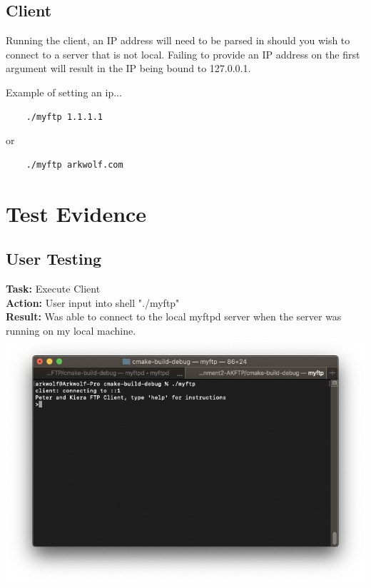 \documentclass{article}
\begin{document}
\subsection{Client}
Running the client, an IP address will need to be parsed in should you wish to connect to a server that is not local. Failing to provide an IP address on the first argument will result in the IP being bound to 127.0.0.1. 

Example of setting an ip...
\begin{lstlisting}
    ./myftp 1.1.1.1
\end{lstlisting}
or
\begin{lstlisting}
    ./myftp arkwolf.com
\end{lstlisting}


\section{Test Evidence}
\subsection{User Testing}
%

\textbf{Task:} Execute Client\\
\textbf{Action:} User input into shell "./myftp"\\
\textbf{Result:} Was able to connect to the local myftpd server when the server was running on my local machine.\\
\includegraphics[width=\textwidth]{testpictures/connect}
\end{document}
